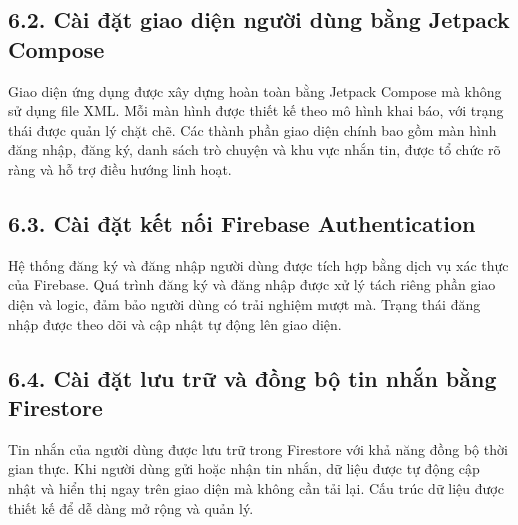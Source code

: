 \documentclass[12pt,a4paper]{article}
\begin{document}
	\vspace{0.7cm}
	
	\subsection*{6.2. Cài đặt giao diện người dùng bằng Jetpack Compose}
	\vspace{0.1cm}
	
	\noindent
	Giao diện ứng dụng được xây dựng hoàn toàn bằng Jetpack Compose mà không sử dụng file XML. Mỗi màn hình được thiết kế theo mô hình khai báo, với trạng thái được quản lý chặt chẽ. Các thành phần giao diện chính bao gồm màn hình đăng nhập, đăng ký, danh sách trò chuyện và khu vực nhắn tin, được tổ chức rõ ràng và hỗ trợ điều hướng linh hoạt.
	
	\vspace{0.7cm}
	
	\subsection*{6.3. Cài đặt kết nối Firebase Authentication}
	\vspace{0.1cm}
	
	\noindent
	Hệ thống đăng ký và đăng nhập người dùng được tích hợp bằng dịch vụ xác thực của Firebase. Quá trình đăng ký và đăng nhập được xử lý tách riêng phần giao diện và logic, đảm bảo người dùng có trải nghiệm mượt mà. Trạng thái đăng nhập được theo dõi và cập nhật tự động lên giao diện.
	
	\vspace{0.7cm}
	
	\subsection*{6.4. Cài đặt lưu trữ và đồng bộ tin nhắn bằng Firestore}
	\vspace{0.1cm}
	
	\noindent
	Tin nhắn của người dùng được lưu trữ trong Firestore với khả năng đồng bộ thời gian thực. Khi người dùng gửi hoặc nhận tin nhắn, dữ liệu được tự động cập nhật và hiển thị ngay trên giao diện mà không cần tải lại. Cấu trúc dữ liệu được thiết kế để dễ dàng mở rộng và quản lý.
	
	\vspace{0.7cm}
	
\end{document}

